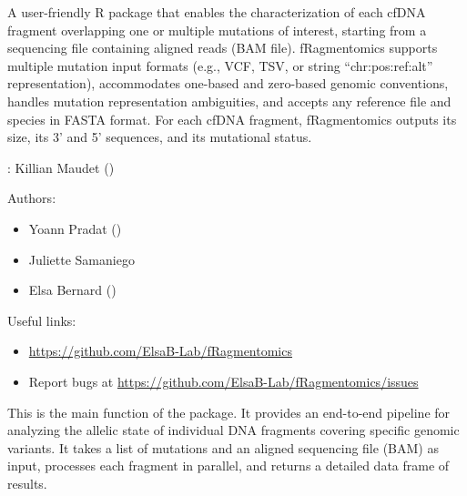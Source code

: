 \documentclass[a4paper]{book}
\begin{document}
%
\begin{Description}
A user-friendly R package that enables the characterization of each cfDNA fragment overlapping one or multiple mutations of interest, starting from a sequencing file containing aligned reads (BAM file). fRagmentomics supports multiple mutation input formats (e.g., VCF, TSV, or string “chr:pos:ref:alt” representation), accommodates one-based and zero-based genomic conventions, handles mutation representation ambiguities, and accepts any reference file and species in FASTA format. For each cfDNA fragment, fRagmentomics outputs its size, its 3’ and 5’ sequences, and its mutational status.
\end{Description}
%
\begin{Author}
: Killian Maudet  ()

Authors:
\begin{itemize}

\item{} Yoann Pradat  ()
\item{} Juliette Samaniego 
\item{} Elsa Bernard  ()

\end{itemize}


\end{Author}
%
\begin{SeeAlso}
Useful links:
\begin{itemize}

\item{} \url{https://github.com/ElsaB-Lab/fRagmentomics}
\item{} Report bugs at \url{https://github.com/ElsaB-Lab/fRagmentomics/issues}

\end{itemize}


\end{SeeAlso}
%
\begin{Description}
This is the main function of the package. It provides an end-to-end pipeline for analyzing the allelic state of
individual DNA fragments covering specific genomic variants. It takes a list of mutations and an aligned sequencing
file (BAM) as input, processes each fragment in parallel, and returns a detailed data frame of results.
\end{Description}
\end{document}
